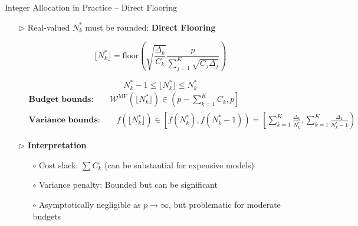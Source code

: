 \documentclass{beamer}
\begin{document}
\begin{frame}{Integer Allocation in Practice -- Direct Flooring }

\begin{itemize}[leftmargin=5pt] 
\item[$\triangleright$] Real-valued $N_k^*$ must be rounded: \textcolor{myblue3}{\bf Direct Flooring}
{\footnotesize
\[
\lfloor N_k^* \rfloor = \text{floor}\left(\sqrt{\frac{\Delta_k}{C_k}} \frac{p}{\sum_{j=1}^K \sqrt{C_j \Delta_j}}\right)
\]

\[
N_k^* -1\le \lfloor N_k^*\rfloor \le N_k^*
\]
\begin{align*}
&\textbf{Budget bounds:}\qquad \mathcal{W}^{\text{MF}}(\lfloor N_k^* \rfloor) \in \left(p - \sum_{k=1}^K C_k, p\right] \\
&\textbf{Variance bounds:} \qquad f(\lfloor N_k^* \rfloor) \in \left[f(N_k^*), f(N_k^*-1)\right)=\left[\sum_{k=1}^K\frac{\Delta_k}{N_k^*},
\sum_{k=1}^K\frac{\Delta_k}{N_k^*-1}\right)
\end{align*}
}


\item[$\triangleright$] \textcolor{myblue3}{\bf Interpretation}
{\footnotesize
\begin{itemize}[leftmargin=15pt] 
\item[$\circ$] Cost slack: $\sum C_k$ (can be substantial for expensive models)
\item[$\circ$] Variance penalty: Bounded but can be significant
\item[$\circ$] Asymptotically negligible as $p \to \infty$, but problematic for moderate budgets
\end{itemize}
}
\end{itemize}
\end{frame}
\end{document}
